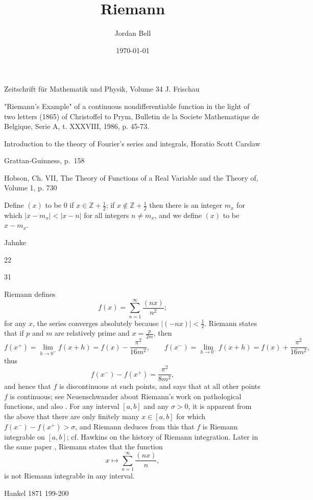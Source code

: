\documentclass{amsart}
\begin{document}
\title{Riemann}
\author{Jordan Bell}
\address{Department of Mathematics, University of Toronto, Toronto, Ontario, Canada}
\date{\today}

\maketitle


Zeitschrift f\"ur Mathematik und Physik, Volume 34
J. Frischau

"Riemann's Example" of a continuous nondifferentiable function in the light of two letters (1865) of Christoffel to Prym, Bulletin de la Societe Mathematique de Belgique, Serie A, t. XXXVIII, 1986, p. 45-73.

Introduction to the theory of Fourier's series and integrals, Horatio Scott Carslaw

Grattan-Guinness, p.~158

Hobson, Ch. VII,
The Theory of Functions of a Real Variable and the Theory of, Volume 1,
p. 730

Define $(x)$ to be $0$ if $x  \in \mathbb{Z}+\frac{1}{2}$; if $x \not \in \mathbb{Z}+\frac{1}{2}$ then there is
an integer $m_x$ for which $|x-m_x| < |x-n|$ for all integers $n \neq m_x$, and we define $(x)$ to be $x-m_x$. 

Jahnke


22

31

Riemann \cite[p.~105, \S 6]{riemann} defines 
\[
f(x)=\sum_{n=1}^\infty \frac{(nx)}{n^2};
\]
for any $x$, the series converges absolutely because $|(-nx)|<\frac{1}{2}$. 
Riemann states that if  $p$ and $m$ are relatively prime and $x=\frac{p}{2m}$,  then
\[
f(x^+)=\lim_{h \to 0^+} f(x+h) = f(x)-\frac{\pi^2}{16m^2}, \qquad f(x^-)=\lim_{h \to 0^-} f(x+h) = f(x)+\frac{\pi^2}{16m^2},
\]
thus
\[
f(x^-)-f(x^+)=\frac{\pi^2}{8m^2},
\]
and hence that $f$ is discontinuous at such points, and says that at all other points $f$ is continuous; see Neuenschwander \cite{neuenschwander} about Riemann's work on pathological functions, and also \cite[p.~37]{pringsheim}.
For any interval $[a,b]$ and any $\sigma>0$, it is apparent from the above that there are only finitely many $x \in [a,b]$ for which
$f(x^-)-f(x^+)>\sigma$, and Riemann deduces from this that $f$ is  Riemann integrable on $[a,b]$; cf. Hawkins  \cite[p.~18]{hawkins} on the history
of Riemann integration.
Later in the same paper  \cite[p.~129, \S 13]{riemann}, Riemann states that the function
\[
x \mapsto \sum_{n=1}^\infty \frac{(nx)}{n},
\] 
is not Riemann integrable in any interval.


Hankel 1871 199-200



\end{document}
